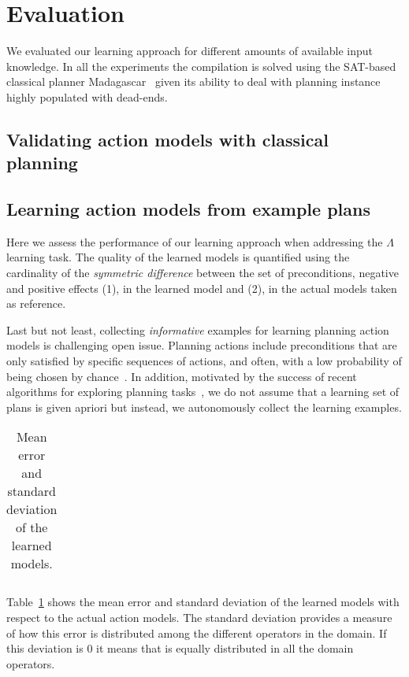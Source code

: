 \documentclass[letterpaper]{article} %
\begin{document}
\section{Evaluation}
We evaluated our learning approach for different amounts of available input knowledge. In all the experiments the compilation is solved using the SAT-based classical planner {\sc Madagascar}~\cite{rintanen2014madagascar} given its ability to deal with planning instance highly populated with dead-ends.


\subsection{Validating action models with classical planning}


\subsection{Learning action models from example plans}
Here we assess the performance of our learning approach when addressing the $\Lambda$ learning task. The quality of the learned models is quantified using the cardinality of the {\em symmetric difference} between the set of preconditions, negative and positive effects (1), in the learned model and (2), in the actual models taken as reference. 

Last but not least, collecting {\em informative} examples for learning planning action models is challenging open issue. Planning actions include preconditions that are only satisfied by specific sequences of actions, and often, with a low probability of being chosen by chance~\cite{fern2004learning}. In addition, motivated by the success of recent algorithms for exploring planning tasks~\cite{geffner:novelty:IJCAI17}, we do not assume that a learning set of plans is given apriori but instead, we autonomously collect the learning examples.

\begin{table}[hbt!]
\begin{footnotesize}
\begin{tabular}{cc}


\end{tabular}
\end{footnotesize}
\caption{\small Mean error and standard deviation of the learned models.}
  \label{tab:eplans}
\end{table}

Table~\ref{tab:eplans} shows the mean error and standard deviation of the learned models with respect to the actual action models. The standard deviation provides a measure of how this error is distributed among the different operators in the domain. If this deviation is 0 it means that is equally distributed in all the domain operators.
\end{document}
